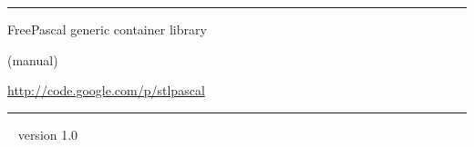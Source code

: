 \documentclass[a4paper]{report}
\begin{document}
\thispagestyle{empty}
\vfill
\vfill
\begin{center}
\begin{minipage}{0.8\textwidth}
\hrule
\bigskip\bigskip
\centerline{\LARGE\sc FreePascal generic container library}
\smallskip
\centerline{(manual)}
\smallskip
\centerline{\url{http://code.google.com/p/stlpascal}}
\bigskip
\bigskip
\bigskip\bigskip
\hrule
\end{minipage}
\end{center}
\vfill
{~}
\hfill version 1.0
\eject %

\tableofcontents












\end{document}
